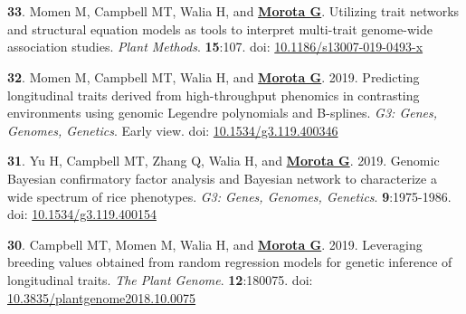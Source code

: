 \documentclass[margin,line,10pt]{res}
\newenvironment{list1}{
  \begin{list}{\ding{113}}{%
      \setlength{\itemsep}{0in}
      \setlength{\parsep}{0in} \setlength{\parskip}{0in}
      \setlength{\topsep}{0in} \setlength{\partopsep}{0in} 
      \setlength{\leftmargin}{0.17in}}}{\end{list}}
\begin{document}
\begin{resume}
\section{}
\begin{list1}

  
\item  [{\bf 33}.] Momen M, Campbell MT, Walia H, and \textbf{\underline{Morota G}}. Utilizing trait networks and structural equation models as tools to interpret multi-trait genome-wide association studies. \emph{Plant Methods}. \textbf{15}:107. doi: \textcolor{blue}{\href{https://doi.org/10.1186/s13007-019-0493-x}{10.1186/s13007-019-0493-x}}

     \vspace{0.5cm}
     
\item  [{\bf 32}.]  Momen M, Campbell MT, Walia H, and \textbf{\underline{Morota G}}. 2019. Predicting longitudinal traits derived from high-throughput phenomics in contrasting environments using genomic Legendre polynomials and B-splines. \emph{G3: Genes, Genomes, Genetics}. Early view.  doi: \textcolor{blue}{\href{https://doi.org/10.1534/g3.119.400346}{10.1534/g3.119.400346}}

     \vspace{0.5cm}

\item  [{\bf 31}.] Yu H, Campbell MT, Zhang Q, Walia H, and \textbf{\underline{Morota G}}. 2019. Genomic Bayesian confirmatory factor analysis and Bayesian network to characterize a wide spectrum of rice phenotypes. \emph{G3: Genes, Genomes, Genetics}. \textbf{9}:1975-1986. doi: \textcolor{blue}{\href{https://doi.org/10.1534/g3.119.400154}{10.1534/g3.119.400154}}

  \vspace{0.5cm}
  
\item  [{\bf 30}.] Campbell MT, Momen M, Walia H, and \textbf{\underline{Morota G}}. 2019. Leveraging breeding values obtained from random regression models for genetic inference of longitudinal traits. \emph{The Plant Genome}. \textbf{12}:180075. doi: \textcolor{blue}{\href{https://doi.org/10.3835/plantgenome2018.10.0075}{10.3835/plantgenome2018.10.0075}}

\end{list1}


\section{}
\begin{list1}


\end{list1}
\end{resume}
\end{document}
